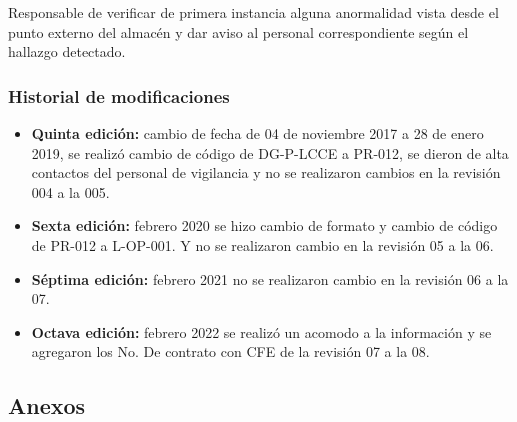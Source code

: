 Responsable de verificar de primera instancia alguna anormalidad vista desde el punto externo del almacén y dar aviso al personal correspondiente según el hallazgo detectado.

\subsubsection{Historial de modificaciones}

\begin{itemize}
	\item \textbf{Quinta edición:} cambio de fecha de 04 de noviembre 2017 a 28 de enero 2019, se realizó cambio de código de DG-P-LCCE a PR-012, se dieron de alta contactos del personal de vigilancia y no se realizaron cambios en la revisión 004 a la 005.
	\item \textbf{Sexta edición:} febrero 2020 se hizo cambio de formato y cambio de código de PR-012 a L-OP-001. Y no se realizaron cambio en la revisión 05 a la 06.
	\item \textbf{Séptima edición:} febrero 2021 no se realizaron cambio en la revisión 06 a la 07.
	\item \textbf{Octava edición:} febrero 2022 se realizó un acomodo a la información y se agregaron los No. De contrato con CFE de la revisión 07 a la 08.
\end{itemize}

\subsection{Anexos}

